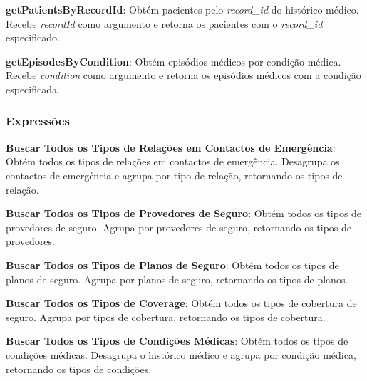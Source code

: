 \vspace{0.15cm}

\textbf{getPatientsByRecordId}: Obtém pacientes pelo \textit{record\_id} do histórico médico. Recebe \textit{recordId} como argumento e retorna os pacientes com o \textit{record\_id} especificado.

\vspace{0.15cm}

\textbf{getEpisodesByCondition}: Obtém episódios médicos por condição médica. Recebe \textit{condition} como argumento e retorna os episódios médicos com a condição especificada.

\vspace{0.3cm}

\subsubsection{Expressões}

\vspace{0.15cm}

\textbf{Buscar Todos os Tipos de Relações em Contactos de Emergência}: Obtém todos os tipos de relações em contactos de emergência. Desagrupa os contactos de emergência e agrupa por tipo de relação, retornando os tipos de relação.

\vspace{0.15cm}

\textbf{Buscar Todos os Tipos de Provedores de Seguro}: Obtém todos os tipos de provedores de seguro. Agrupa por provedores de seguro, retornando os tipos de provedores.

\vspace{0.15cm}

\textbf{Buscar Todos os Tipos de Planos de Seguro}: Obtém todos os tipos de planos de seguro. Agrupa por planos de seguro, retornando os tipos de planos.

\vspace{0.15cm}

\textbf{Buscar Todos os Tipos de Coverage}: Obtém todos os tipos de cobertura de seguro. Agrupa por tipos de cobertura, retornando os tipos de cobertura.

\vspace{0.15cm}

\textbf{Buscar Todos os Tipos de Condições Médicas}: Obtém todos os tipos de condições médicas. Desagrupa o histórico médico e agrupa por condição médica, retornando os tipos de condições.

\vspace{0.15cm}

